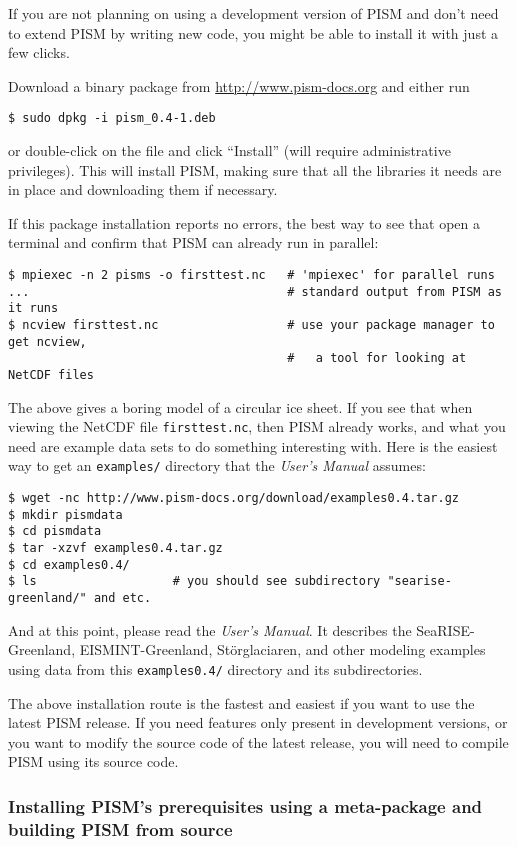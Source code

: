 \documentclass[11pt,final]{amsart}
\begin{document}
If you are not planning on using a development version of PISM and don't need to extend PISM by writing new code, you might be
able to install it with just a few clicks.

Download a binary package from \url{http://www.pism-docs.org} and either run
\begin{verbatim}
$ sudo dpkg -i pism_0.4-1.deb
\end{verbatim}%
or double-click on the file and click ``Install'' (will require administrative privileges). This will install PISM, making sure that
all the libraries it needs are in place and downloading them if necessary.

If this package installation reports no errors, the best way to see that open a terminal and confirm that PISM can already run in parallel:
\begin{verbatim}
$ mpiexec -n 2 pisms -o firsttest.nc   # 'mpiexec' for parallel runs
...                                    # standard output from PISM as it runs
$ ncview firsttest.nc                  # use your package manager to get ncview,
                                       #   a tool for looking at NetCDF files
\end{verbatim}%
The above gives a boring model of a circular ice sheet.  If you see that when viewing the NetCDF file \texttt{firsttest.nc}, then PISM already works, and what you need are example data sets to do something interesting with.  Here is the easiest way to get an \texttt{examples/} directory that the \emph{User's Manual} assumes:
\begin{verbatim}
$ wget -nc http://www.pism-docs.org/download/examples0.4.tar.gz
$ mkdir pismdata
$ cd pismdata
$ tar -xzvf examples0.4.tar.gz
$ cd examples0.4/
$ ls                   # you should see subdirectory "searise-greenland/" and etc.
\end{verbatim}%
And at this point, please read the \emph{User's Manual}.  It describes the SeaRISE-Greenland, EISMINT-Greenland, St\"orglaciaren, and other modeling examples using data from this \texttt{examples0.4/} directory and its subdirectories.

The above installation route is the fastest and easiest if you want to use the latest PISM release.  If you need features only present in development versions, or you want to modify the source code of the latest release, you will need to compile PISM using its source code.  



\subsubsection{Installing PISM's prerequisites using a meta-package and building PISM from source}
\label{sec:deb-pism-toolkit}
\end{document}
